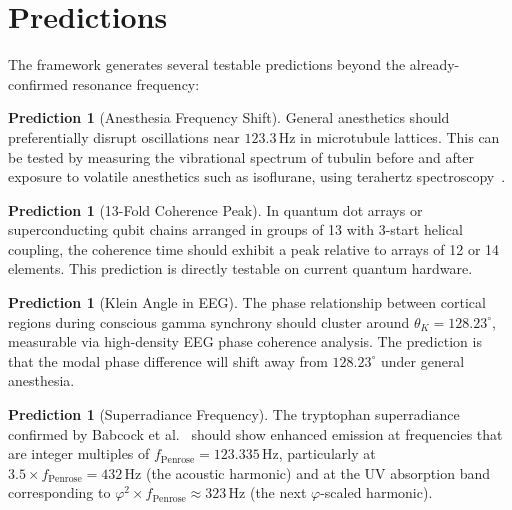 \documentclass[12pt,a4paper]{article}
\theoremstyle{plain}
\theoremstyle{definition}
\newtheorem{prediction}[theorem]{Prediction}
\newcommand{\thetaK}{\theta_K}
\newcommand{\golden}{\varphi}
\newcommand{\Hz}{\,\mathrm{Hz}}
\begin{document}
\section{Predictions}
\label{sec:predictions}

The framework generates several testable predictions beyond the already-confirmed resonance frequency:

\begin{prediction}[Anesthesia Frequency Shift]
\label{pred:anesthesia}
General anesthetics should preferentially disrupt oscillations near $123.3\Hz$ in microtubule lattices. This can be tested by measuring the vibrational spectrum of tubulin before and after exposure to volatile anesthetics such as isoflurane, using terahertz spectroscopy~\cite{lundholm2015}.
\end{prediction}

\begin{prediction}[13-Fold Coherence Peak]
\label{pred:thirteen}
In quantum dot arrays or superconducting qubit chains arranged in groups of 13 with 3-start helical coupling, the coherence time should exhibit a peak relative to arrays of 12 or 14 elements. This prediction is directly testable on current quantum hardware.
\end{prediction}

\begin{prediction}[Klein Angle in EEG]
\label{pred:eeg}
The phase relationship between cortical regions during conscious gamma synchrony should cluster around $\thetaK = 128.23^\circ$, measurable via high-density EEG phase coherence analysis. The prediction is that the modal phase difference will shift away from $128.23^\circ$ under general anesthesia.
\end{prediction}

\begin{prediction}[Superradiance Frequency]
\label{pred:superradiance}
The tryptophan superradiance confirmed by Babcock et al.~\cite{babcock2024} should show enhanced emission at frequencies that are integer multiples of $f_{\mathrm{Penrose}} = 123.335\Hz$, particularly at $3.5 \times f_{\mathrm{Penrose}} = 432\Hz$ (the acoustic harmonic) and at the UV absorption band corresponding to $\golden^2 \times f_{\mathrm{Penrose}} \approx 323\Hz$ (the next $\golden$-scaled harmonic).
\end{prediction}

\end{document}
